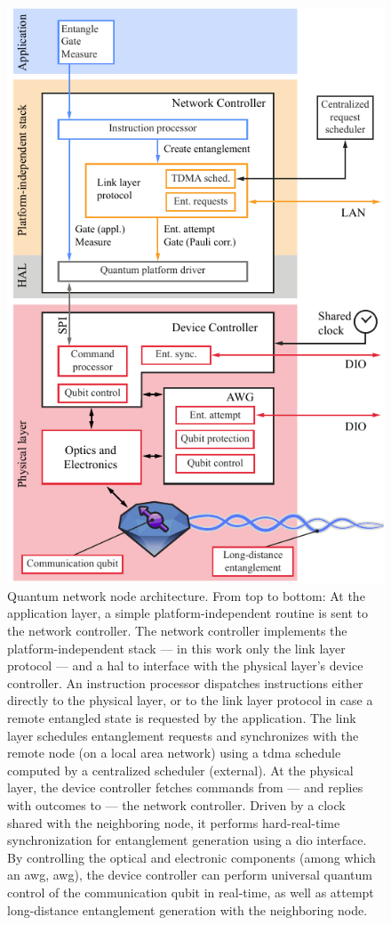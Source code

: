\begin{figure}[!t]
    \centering
    \includegraphics[width=0.6\linewidth]{figures/netnode.pdf}
    \caption{
        Quantum network node architecture. From top to bottom: At the application layer, a simple
        platform-independent routine is sent to the network controller. The network controller
        implements the platform-independent stack --- in this work only the link layer protocol ---
        and a \acrfull{hal} to interface with the physical layer's device controller. An instruction
        processor dispatches instructions either directly to the physical layer, or to the link
        layer protocol in case a remote entangled state is requested by the application. The link
        layer schedules entanglement requests and synchronizes with the remote node (on a local area
        network) using a \acrfull{tdma} schedule computed by a centralized scheduler (external). At
        the physical layer, the device controller fetches commands from --- and replies with
        outcomes to --- the network controller. Driven by a clock shared with the neighboring node,
        it performs hard-real-time synchronization for entanglement generation using a \acrfull{dio}
        interface. By controlling the optical and electronic components (among which an
        \acrlong{awg}, \acrshort{awg}), the device controller can perform universal quantum control
        of the communication qubit in real-time, as well as attempt long-distance entanglement
        generation with the neighboring node.
    }
    \label{fig:netnode}
\end{figure}

